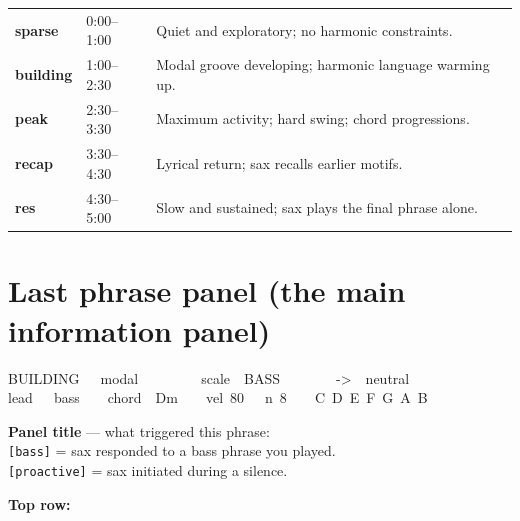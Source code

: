 \documentclass[10pt,a4paper]{article}
\newcommand{\field}[1]{\texttt{\small #1}}
\newenvironment{dashpanel}[1]{%
  \begin{mdframed}[backgroundcolor=codebg, linecolor=dimgrey,
    linewidth=0.5pt, innerleftmargin=8pt, innerrightmargin=8pt,
    innertopmargin=4pt, innerbottommargin=4pt,
    frametitle={\scriptsize\color{dimgrey}#1},
    frametitleaboveskip=3pt, frametitlebelowskip=2pt]
  \ttfamily\small\color{codetext}
}{%
  \end{mdframed}
}
\begin{document}
\vspace{2pt}
\begin{tabularx}{\linewidth}{@{}p{2.8cm}p{1.6cm}X@{}}
\textcolor{stagesparse}{\textbf{sparse}}       & 0:00--1:00 & Quiet and exploratory; no harmonic constraints. \\
\textcolor{stagebuilding}{\textbf{building}}   & 1:00--2:30 & Modal groove developing; harmonic language warming up. \\
\textcolor{stagepeak}{\textbf{peak}}           & 2:30--3:30 & Maximum activity; hard swing; chord progressions. \\
\textcolor{stagerecap}{\textbf{recap}}         & 3:30--4:30 & Lyrical return; sax recalls earlier motifs. \\
\textcolor{stageresolution}{\textbf{res}}      & 4:30--5:00 & Slow and sustained; sax plays the final phrase alone. \\
\end{tabularx}

\section{Last phrase panel \textnormal{\small(the main information panel)}}

\begin{dashpanel}{last phrase \quad{[bass]}}
\textcolor{codecyan}{BUILDING}~~~\textcolor{codecyan}{modal}~~~~~~~~~scale~~\textcolor{stagebuilding}{BASS}~~~~~~~~{->}~~neutral\\
lead~~~bass~~~~\textcolor{codeyellow}{chord~~Dm}~~~~vel~80~~~n~8~~~~\textcolor{codecyan}{C~D~E~F~G~A~B}
\end{dashpanel}

\vspace{6pt}
\noindent\textbf{Panel title} --- what triggered this phrase:\\[2pt]
\hspace*{1em}\field{[bass]} = sax responded to a bass phrase you played.\\
\hspace*{1em}\field{[proactive]} = sax initiated during a silence.

\vspace{6pt}
\noindent\textbf{Top row:}
\end{document}
